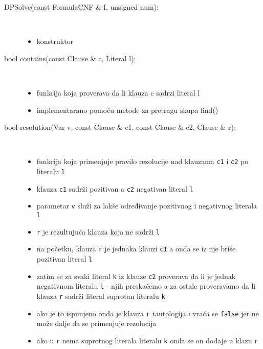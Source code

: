 \documentclass[a4paper, 12pt]{article}
\begin{document}
\begin{description}
	\item[DPSolve(const FormulaCNF \& f, unsigned num);] ~ 
	\begin{itemize}
		\item konstruktor
	\end{itemize}
	
	\item[bool contains(const Clause \& c, Literal l);] ~
	\begin{itemize}
		\item funkcija koja proverava da li klauza c sadrzi literal l
		\item implementarano pomoću metode za pretragu skupa find()
	\end{itemize}

	\item[bool resolution(Var v, const Clause \& c1, const Clause \& c2, Clause \& r);]
	~ 
	\begin{itemize}
		\item funkcija koja primenjuje pravilo rezolucije nad klauzama \verb|c1| i \verb|c2| po literalu \verb|l| 
		\item klauza \verb|c1| sadrži pozitivan a \verb|c2| negativan literal \verb|l|
		\item parametar \verb|v| služi za lakše određivanje pozitivnog i negativnog literala \verb|l|
		\item \verb|r| je rezultujuća klauza koja ne sadrži \verb|l| 
		\item na početku, klauza \verb|r| je jednaka klauzi \verb|c1| a onda se iz nje briše pozitivan literal \verb|l|
		\item zatim se za svaki literal \verb|k| iz klauze \verb|c2| proverava da li je jednak negativnom literalu \verb|l| - njih preskačemo a za ostale proveravamo da li klauza \verb|r| sadrži literal suprotan literalu \verb|k|
		\item ako je to ispunjeno onda je klauza \verb|r| tautologija i vraća se \verb|false| jer ne može dalje da se primenjuje rezolucija
		\item ako u \verb|r| nema suprotnog literala literalu \verb|k| onda se on dodaje u klazu \verb|r|
	\end{itemize}


\end{description}
\end{document}
